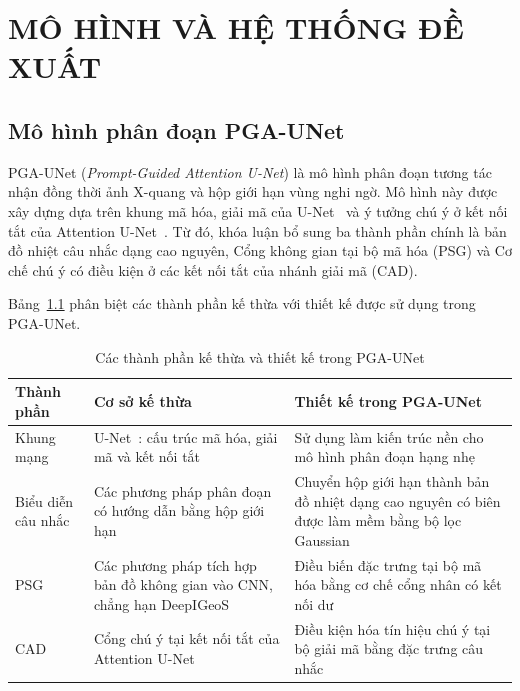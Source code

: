 \chapter{MÔ HÌNH VÀ HỆ THỐNG ĐỀ XUẤT}
\label{Chapter3}

\section{Mô hình phân đoạn PGA-UNet}
\label{sec:pga_unet}

PGA-UNet (\textit{Prompt-Guided Attention U-Net}) là mô hình phân đoạn tương tác nhận đồng thời ảnh X-quang và hộp giới hạn vùng nghi ngờ. Mô hình này được xây dựng dựa trên khung mã hóa, giải mã của U-Net~\cite{ronneberger2015unet} và ý tưởng chú ý ở kết nối tắt của Attention U-Net~\cite{oktay2018attentionunet}. Từ đó, khóa luận bổ sung ba thành phần chính là bản đồ nhiệt câu nhắc dạng cao nguyên, Cổng không gian tại bộ mã hóa (PSG) và Cơ chế chú ý có điều kiện ở các kết nối tắt của nhánh giải mã (CAD).

Bảng~\ref{tab:inheritance_contribution} phân biệt các thành phần kế thừa với thiết kế được sử dụng trong PGA-UNet.

\begin{table}[htbp]
    \centering
    \caption{Các thành phần kế thừa và thiết kế trong PGA-UNet}
    \label{tab:inheritance_contribution}
    \renewcommand{\arraystretch}{1.3}
    \setlength{\tabcolsep}{4pt}
    \small
    \begin{tabular}{|p{3.1cm}|p{5.1cm}|p{6.1cm}|}
        \hline
        \textbf{Thành phần}
        & \textbf{Cơ sở kế thừa}
        & \textbf{Thiết kế trong PGA-UNet} \\
        \hline
        Khung mạng
        & U-Net~\cite{ronneberger2015unet}: cấu trúc mã hóa, giải mã và kết nối tắt
        & Sử dụng làm kiến trúc nền cho mô hình phân đoạn hạng nhẹ \\
        \hline
        Biểu diễn câu nhắc
        & Các phương pháp phân đoạn có hướng dẫn bằng hộp giới hạn
        & Chuyển hộp giới hạn thành bản đồ nhiệt dạng cao nguyên có biên được làm mềm bằng bộ lọc Gaussian \\
        \hline
        PSG
        & Các phương pháp tích hợp bản đồ không gian vào CNN, chẳng hạn DeepIGeoS~\cite{wang2019deepigeos}
        & Điều biến đặc trưng tại bộ mã hóa bằng cơ chế cổng nhân có kết nối dư \\
        \hline
        CAD
        & Cổng chú ý tại kết nối tắt của Attention U-Net~\cite{oktay2018attentionunet}
        & Điều kiện hóa tín hiệu chú ý tại bộ giải mã bằng đặc trưng câu nhắc \\
        \hline
    \end{tabular}
\end{table}


